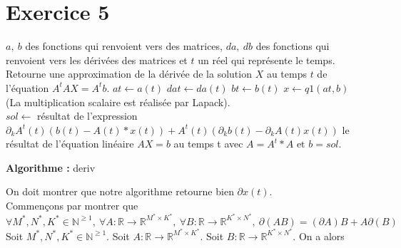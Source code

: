 \documentclass[a4paper, 10pt]{article}
\newcommand{\IR}{\mathbb{R}}
\newcommand{\IN}{\mathbb{N}}
\begin{document}
\section{Exercice 5}

\begin{algorithm}

\begin{algorithmic}[1]

\REQUIRE \( a,~ b \) des fonctions qui renvoient vers des matrices, \( da,~ db \) des fonctions qui renvoient vers les dérivées des matrices et \( t \) un réel qui représente le temps.
\ENSURE Retourne une approximation de la dérivée de la solution \( X \) au temps \( t \) de l'équation \( A^tAX = A^tb \).
\STATE \( at \leftarrow a(t) \)
\STATE \( dat \leftarrow da(t) \)
\STATE \( bt \leftarrow b(t) \)
\STATE \( x \leftarrow q1(at, b) \) \\
(La multiplication scalaire est réalisée par Lapack). \\
\STATE \( sol \leftarrow \) résultat de l'expression \( \partial_k A^t(t) \left( b(t) - A(t) * x(t) \right) + A^t(t) \left( \partial_k b(t) - \partial_k A(t) x(t) \right) \)
\RETURN le résultat de l'équation linéaire \( AX = b \) au temps t avec \( A = A^t * A \text{ et } b = sol \).
\caption{\textbf{Algorithme : }deriv}

\end{algorithmic}

\end{algorithm}
\noindent
On doit montrer que notre algorithme retourne bien \( \partial x(t) \). \\
Commençons par montrer que
$$
\forall M^*, N^*, K^* \in \IN^{\geq 1},~ \forall A : \IR \to \IR^{M^* \times K^*},~ \forall B : \IR \to \IR^{K^* \times N^*},~ \partial (AB) = (\partial A) B + A \partial(B)
$$
Soit \( M^*, N^*, K^* \in \IN^{\geq 1} \). Soit \( A : \IR \to \IR^{M^* \times K^*} \). Soit \( B : \IR \to \IR^{K^* \times N^*} \). On a alors
\end{document}
